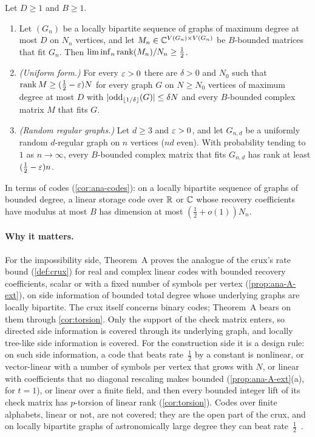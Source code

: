 \begin{theorem}\label{thm:A}
\notformalized
Let $D\ge1$ and $B\ge1$.
\begin{enumerate}[label=(\roman*)]
\item Let $(G_n)$ be a locally bipartite sequence of graphs of maximum degree at most $D$ on $N_n$ vertices, and let
  $M_n\in\mathbb{C}^{V(G_n)\times V(G_n)}$ be $B$-bounded matrices that fit $G_n$. Then
  $\liminf_n\operatorname{rank}(M_n)/N_n\ge\frac12$.
\item \emph{(Uniform form.)} For every $\varepsilon>0$ there are $\delta>0$ and $N_0$ such that $\operatorname{rank} M\ge(\frac12-\varepsilon)N$
  for every graph $G$ on $N\ge N_0$ vertices of maximum degree at most $D$ with
  $\lvert \mathrm{odd}_{\lfloor1/\delta\rfloor}(G) \rvert\le\delta N$ and every $B$-bounded complex matrix $M$ that fits $G$.
\item \emph{(Random regular graphs.)} Let $d\ge3$ and $\varepsilon>0$, and let $G_{n,d}$ be a uniformly random $d$-regular
  graph on $n$ vertices ($nd$ even). With probability tending to $1$ as $n\to\infty$, every $B$-bounded complex matrix
  that fits $G_{n,d}$ has rank at least $(\frac12-\varepsilon)n$.
\end{enumerate}
\end{theorem}

In terms of codes (\cref{cor:ana-codes}): on a locally bipartite sequence of graphs of bounded degree, a linear storage
code over $\mathbb{R}$ or $\mathbb{C}$ whose recovery coefficients have modulus at most $B$ has dimension at most $(\frac12+o(1))N_n$.

\paragraph{Why it matters.} For the impossibility side, Theorem~A proves the analogue of the crux's rate bound
(\cref{def:crux}) for real and complex linear codes with bounded recovery coefficients, scalar or with a fixed number of
symbols per vertex (\cref{prop:ana-A-ext}), on side information of bounded total degree whose underlying graphs are
locally bipartite. The crux itself concerns binary codes; Theorem~A bears on them through \cref{cor:torsion}. Only the support of the check matrix enters, so directed side information is
covered through its underlying graph, and locally tree-like side information is covered. For the construction side it
is a design rule: on such side information, a code that beats rate~$\frac12$ by a constant is nonlinear, or vector-linear
with a number of symbols per vertex that grows with $N$, or linear with coefficients that no diagonal rescaling makes
bounded (\cref{prop:ana-A-ext}(a), for $t=1$), or linear over a finite field, and then every bounded integer lift of its
check matrix has $p$-torsion of linear rank (\cref{cor:torsion}). Codes over finite alphabets, linear or not, are not
covered; they are the open part of the crux, and on locally bipartite graphs of astronomically large degree they can
beat rate~$\frac12$~\cite[Corollary~U]{StorageCodes2026}.

